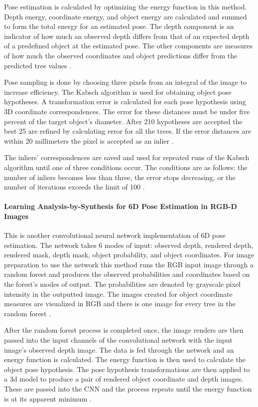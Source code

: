 \documentclass[12pt]{article}
\begin{document}
Pose estimation is calculated by optimizing the energy function in this
method. Depth energy, coordinate energy, and object energy are
calculated and summed to form the total energy for an estimated pose.
The depth component is an indicator of how much an observed depth
differs from that of an expected depth of a predefined object at the
estimated pose. The other components are measures of how much the
observed coordinates and object predictions differ from the predicted
tree values \autocite{brachmann2}.

Pose sampling is done by choosing three pixels from an integral of the
image to increase efficiency. The Kabsch algorithm is used for obtaining
object pose hypotheses. A transformation error is calculated for each
pose hypothesis using 3D coordinate correspondences. The error for these
distances must be under five percent of the target object's diameter.
After 210 hypotheses are accepted the best 25 are refined by calculating
error for all the trees. If the error distances are within 20
millimeters the pixel is accepted as an inlier \autocite{brachmann2}.

The inliers' correspondences are saved and used for repeated runs of the
Kabsch algorithm until one of three conditions occur. The conditions are
as follows: the number of inliers becomes less than three, the error
stops decreasing, or the number of iterations exceeds the limit of 100
\autocite{brachmann2}.

\paragraph{Learning Analysis-by-Synthesis for 6D Pose Estimation in
RGB-D
Images}\label{learning-analysis-by-synthesis-for-6d-pose-estimation-in-rgb-d-images}

This is another convolutional neural network implementation of 6D pose
estimation. The network takes 6 modes of input: observed depth, rendered
depth, rendered mask, depth mask, object probability, and object
coordinates. For image preparation to use the network this method runs
the RGB input image through a random forest and produces the observed
probabilities and coordinates based on the forest's modes of output. The
probabilities are denoted by grayscale pixel intensity in the outputted
image. The images created for object coordinate measures are visualized
in RGB and there is one image for every tree in the random forest
\autocite{krull}.

After the random forest process is completed once, the image renders are
then passed into the input channels of the convolutional network with
the input image's observed depth image. The data is fed through the
network and an energy function is calculated. The energy function is
then used to calculate the object pose hypothesis. The pose hypothesis
transformations are then applied to a 3d model to produce a pair of
rendered object coordinate and depth images. These are passed into the
CNN and the process repeats until the energy function is at its apparent
minimum \autocite{krull}.
\end{document}
